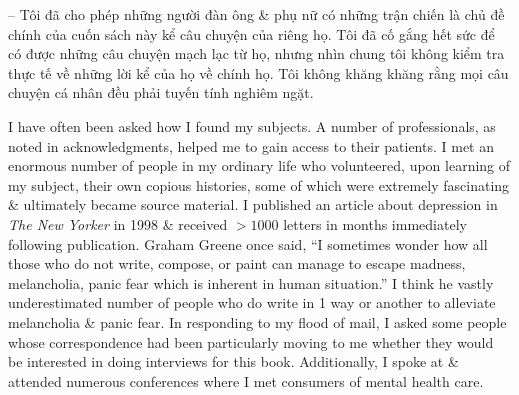 \documentclass{article}
\begin{document}
\begin{itemize}
	-- Tôi đã cho phép những người đàn ông \& phụ nữ có những trận chiến là chủ đề chính của cuốn sách này kể câu chuyện của riêng họ. Tôi đã cố gắng hết sức để có được những câu chuyện mạch lạc từ họ, nhưng nhìn chung tôi không kiểm tra thực tế về những lời kể của họ về chính họ. Tôi không khăng khăng rằng mọi câu chuyện cá nhân đều phải tuyến tính nghiêm ngặt.
	
	I have often been asked how I found my subjects. A number of professionals, as noted in acknowledgments, helped me to gain access to their patients. I met an enormous number of people in my ordinary life who volunteered, upon learning of my subject, their own copious histories, some of which were extremely fascinating \& ultimately became source material. I published an article about depression in {\it The New Yorker} in 1998 \& received $> 1000$ letters in months immediately following publication. {\sc Graham Greene} once said, ``I sometimes wonder how all those who do not write, compose, or paint can manage to escape madness, melancholia, panic fear which is inherent in human situation.'' I think he vastly underestimated number of people who do write in 1 way or another to alleviate melancholia \& panic fear. In responding to my flood of mail, I asked some people whose correspondence had been particularly moving to me whether they would be interested in doing interviews for this book. Additionally, I spoke at \& attended numerous conferences where I met consumers of mental health care.
	

\end{itemize}
\end{document}
